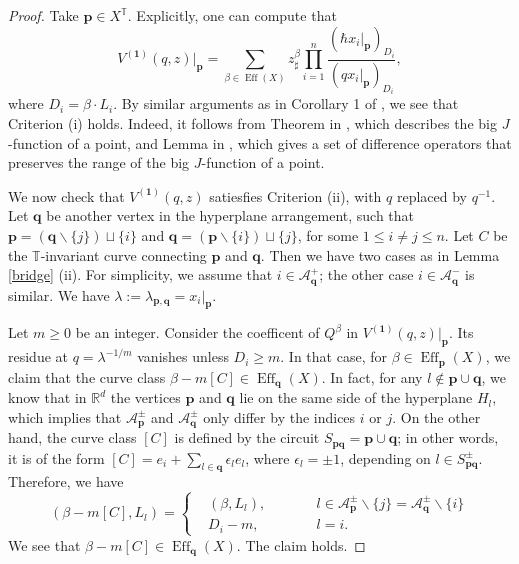 \documentclass[10pt]{amsart}
\theoremstyle{definition}
\def\RR{{\mathbb{R}}}
\def\TT{\mathbb{T}}
\newcommand{\bp}{\mathbf{p}}
\newcommand{\bq}{\mathbf{q}}
\newcommand{\bone}{\mathbf{1}}
\newcommand{\cA}{\mathcal{A}}
\newcommand{\Eff}{\operatorname{Eff}}
\theoremstyle{definition}
\numberwithin{equation}{section}
\theoremstyle{Theorem}
\begin{document}
\begin{proof}
Take $\bp \in X^\TT$. Explicitly, one can compute that
$$
V^{(\bone)}(q,z) \big|_\bp  = \sum_{\beta \in \Eff(X)} z_\sharp^\beta  \prod_{i=1}^n \frac{ ( \hbar x_i |_\bp )_{D_i} }{ ( q x_i |_\bp )_{D_i} } ,
$$
where $D_i = \beta \cdot L_i$. By similar arguments as in Corollary 1 of \cite{Giv4}, we see that Criterion (i) holds. Indeed, it follows from Theorem in \cite{Giv2}, which describes the big $J$-function of a point, and Lemma in \cite{Giv4}, which gives a set of difference operators that preserves the range of the big $J$-function of a point.

We now check that $V^{(\bone)} (q , z)$ satiesfies Criterion (ii), with $q$ replaced by $q^{-1}$.  Let  $\bq$ be another vertex in the hyperplane arrangement, such that $\bp = (\bq \backslash \{j\} ) \sqcup \{i\}$ and $\bq = (\bp \backslash \{i\} ) \sqcup \{j\}$, for some $1\leq i\neq  j\leq n$. Let $C$ be the $\TT$-invariant curve connecting $\bp$ and $\bq$. Then we have two cases as in Lemma \ref{bridge} (ii). For simplicity, we assume that $i\in \cA_\bq^+$; the other case $i\in \cA_\bq^-$ is similar. We have $\lambda:= \lambda_{\bp, \bq} = x_i |_\bp$.

Let $m\geq 0$ be an integer. Consider the coefficent of $Q^\beta$ in $V^{(\bone)} (q,z) |_\bp$. Its residue at $q = \lambda^{-1/m}$ vanishes unless $D_i \geq m$. In that case, for $\beta \in \Eff_\bp (X)$, we claim that the curve class $\beta - m[C] \in \Eff_\bq (X)$. In fact, for any $l\not\in \bp \cup \bq$, we know that in $\RR^d$ the vertices $\bp$ and $\bq$ lie on the same side of the hyperplane $H_l$, which implies that $\cA_\bp^\pm$ and $\cA_\bq^\pm$ only differ by the indices $i$ or $j$. On the other hand, the curve class $[C]$ is defined by the circuit $S_{\bp \bq} =  \bp \cup \bq$; in other words, it is of the form $[C] = e_i + \sum_{l\in \bq } \epsilon_l e_l$, where $\epsilon_l = \pm 1$, depending on $l \in S_{\bp \bq}^\pm$. Therefore, we have
$$
(\beta - m[C],  L_l) = \left\{ \begin{aligned}
& (\beta,  L_l ) , && \qquad l \in \cA_\bp^\pm \backslash \{j\} = \cA_\bq^\pm \backslash \{i\} \\
& D_i - m , && \qquad l = i .
\end{aligned} \right.
$$
We see that $\beta - m [ C] \in \Eff_\bq (X)$. The claim holds.


\end{proof}
\end{document}
